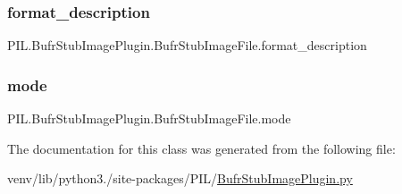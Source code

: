 \subsubsection{\texorpdfstring{format\+\_\+description}{format\_description}}
{\footnotesize\ttfamily P\+I\+L.\+Bufr\+Stub\+Image\+Plugin.\+Bufr\+Stub\+Image\+File.\+format\+\_\+description\hspace{0.3cm}{\ttfamily [static]}}

\mbox{\label{classPIL_1_1BufrStubImagePlugin_1_1BufrStubImageFile_a2f54ce2048c6d7725d400d0de6d89d1e}} 
\subsubsection{\texorpdfstring{mode}{mode}}
{\footnotesize\ttfamily P\+I\+L.\+Bufr\+Stub\+Image\+Plugin.\+Bufr\+Stub\+Image\+File.\+mode}



The documentation for this class was generated from the following file\+:\begin{DoxyCompactItemize}
\item 
venv/lib/python3./site-\/packages/\+P\+I\+L/\hyperlink{BufrStubImagePlugin_8py}{Bufr\+Stub\+Image\+Plugin.\+py}\end{DoxyCompactItemize}
